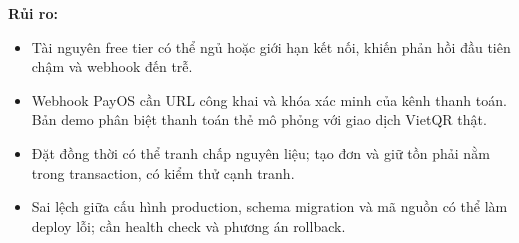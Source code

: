 \textbf{Rủi ro:}
\begin{itemize}
  \item Tài nguyên free tier có thể ngủ hoặc giới hạn kết nối, khiến phản hồi đầu tiên chậm và webhook đến trễ.
  \item Webhook PayOS cần URL công khai và khóa xác minh của kênh thanh toán. Bản demo phân biệt thanh toán thẻ mô phỏng với giao dịch VietQR thật.
  \item Đặt đồng thời có thể tranh chấp nguyên liệu; tạo đơn và giữ tồn phải nằm trong transaction, có kiểm thử cạnh tranh.
  \item Sai lệch giữa cấu hình production, schema migration và mã nguồn có thể làm deploy lỗi; cần health check và phương án rollback.
\end{itemize}
